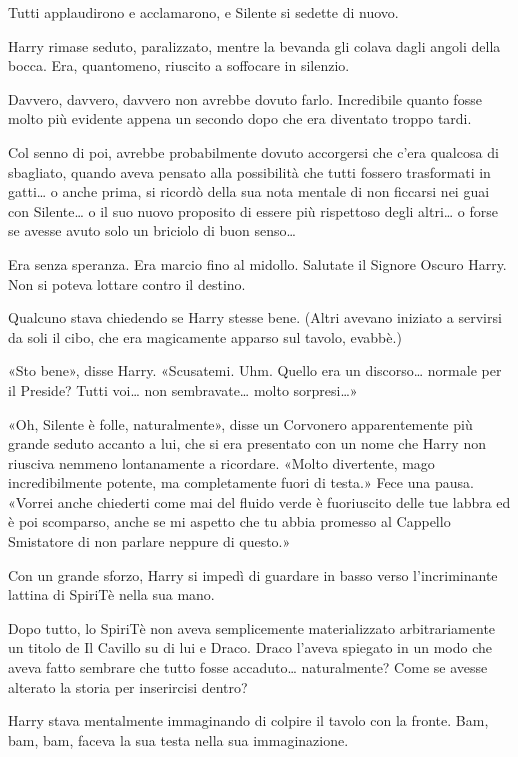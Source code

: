 Tutti applaudirono e acclamarono, e Silente si sedette di nuovo.

Harry rimase seduto, paralizzato, mentre la bevanda gli colava dagli angoli della bocca. Era, quantomeno, riuscito a soffocare in silenzio.

Davvero, davvero, davvero non avrebbe dovuto farlo. Incredibile quanto fosse molto più evidente appena un secondo dopo che era diventato troppo tardi.

Col senno di poi, avrebbe probabilmente dovuto accorgersi che c’era qualcosa di sbagliato, quando aveva pensato alla possibilità che tutti fossero trasformati in gatti… o anche prima, si ricordò della sua nota mentale di non ficcarsi nei guai con Silente… o il suo nuovo proposito di essere più rispettoso degli altri… o forse se avesse avuto solo un briciolo di buon senso…

Era senza speranza. Era marcio fino al midollo. Salutate il Signore Oscuro Harry. Non si poteva lottare contro il destino.

Qualcuno stava chiedendo se Harry stesse bene. (Altri avevano iniziato a servirsi da soli il cibo, che era magicamente apparso sul tavolo, evabbè.)

«Sto bene», disse Harry. «Scusatemi. Uhm. Quello era un discorso… normale per il Preside? Tutti voi… non sembravate… molto sorpresi…»

«Oh, Silente è folle, naturalmente», disse un Corvonero apparentemente più grande seduto accanto a lui, che si era presentato con un nome che Harry non riusciva nemmeno lontanamente a ricordare. «Molto divertente, mago incredibilmente potente, ma completamente fuori di testa.» Fece una pausa. «Vorrei anche chiederti come mai del fluido verde è fuoriuscito delle tue labbra ed è poi scomparso, anche se mi aspetto che tu abbia promesso al Cappello Smistatore di non parlare neppure di questo.»

Con un grande sforzo, Harry si impedì di guardare in basso verso l’incriminante lattina di SpiriTè nella sua mano.

Dopo tutto, lo SpiriTè non aveva semplicemente materializzato arbitrariamente un titolo de Il Cavillo su di lui e Draco. Draco l’aveva spiegato in un modo che aveva fatto sembrare che tutto fosse accaduto… naturalmente? Come se avesse alterato la storia per inserircisi dentro?

Harry stava mentalmente immaginando di colpire il tavolo con la fronte. Bam, bam, bam, faceva la sua testa nella sua immaginazione.

